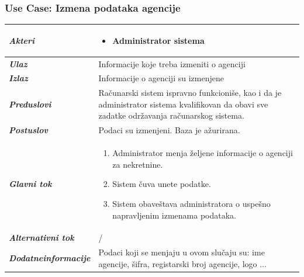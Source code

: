 \documentclass[20pt]{article}
\begin{document}
\subsubsection{\bfseries \large Use Case: Izmena podataka agencije}
\begin{center}
\begin{tabular}{p{0.23\linewidth} p{0.77\linewidth}}
 \hline
 {\it \bfseries Akteri} & \begin{itemize}
    \item Administrator sistema
\end{itemize}\\
\hline

 {\it \bfseries Ulaz} & Informacije koje treba izmeniti o agenciji\\ 
 \hline
 
 {\it \bfseries Izlaz} & Informacije o agenciji su izmenjene\\
 \hline
 
 {\it \bfseries Preduslovi} & Ra\v {c}unarski sistem ispravno funkcioni\v {s}e, kao i da je administrator sistema kvalifikovan da obavi sve zadatke odr\v {z}avanja ra\v {c}unarskog sistema.\\
 \hline

 {\it \bfseries Postuslov} & Podaci su izmenjeni. Baza je a\v {z}urirana.\\
 \hline

     {\it \bfseries Glavni tok} &  
     \begin{enumerate}
         \item  Administrator menja \v {z}eljene informacije o agenciji za nekretnine.
         \item Sistem \v {c}uva unete podatke.
         \item  Sistem obave\v {s}tava administratora o uspe\v {s}no napravljenim izmenama podataka.
    \end{enumerate}\\
 \hline

 {\it \bfseries Alternativni tok} & /\\
 \hline
 
 {\it \bfseries Dodatne\newline informacije} & Podaci koji se menjaju u ovom slu\v {c}aju su: ime agencije, \v {s}ifra, registarski broj agencije, logo ...\\
 \hline

\end{tabular}
\end{center}
\newpage
\end{document}
